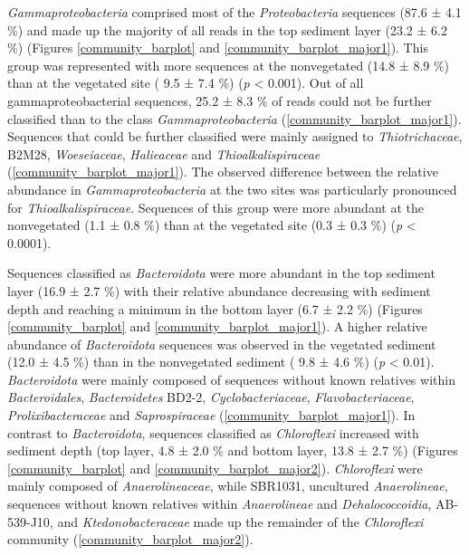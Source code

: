 \documentclass[12pt,]{article}
\begin{document}
\emph{Gammaproteobacteria} comprised most of the \emph{Proteobacteria}
sequences (87.6 ± 4.1 \si{\percent}) and made up the majority of all
reads in the top sediment layer (23.2 ± 6.2 \si{\percent}) (Figures
\ref{community_barplot} and \ref{community_barplot_major1}). This group
was represented with more sequences at the nonvegetated (14.8 ± 8.9
\si{\percent}) than at the vegetated site ( 9.5 ± 7.4 \si{\percent})
(\emph{p} \textless{} 0.001). Out of all gammaproteobacterial sequences,
25.2 ± 8.3 \si{\percent} of reads could not be further classified than
to the class \emph{Gammaproteobacteria}
(\autoref{community_barplot_major1}). Sequences that could be further
classified were mainly assigned to \emph{Thiotrichaceae}, B2M28,
\emph{Woeseiaceae}, \emph{Halieaceae} and \emph{Thioalkalispiraceae}
(\autoref{community_barplot_major1}). The observed difference between
the relative abundance in \emph{Gammaproteobacteria} at the two sites
was particularly pronounced for \emph{Thioalkalispiraceae}. Sequences of
this group were more abundant at the nonvegetated (1.1 ± 0.8
\si{\percent}) than at the vegetated site (0.3 ± 0.3 \si{\percent})
(\emph{p} \textless{} 0.0001).

Sequences classified as \emph{Bacteroidota} were more abundant in the
top sediment layer (16.9 ± 2.7 \si{\percent}) with their relative
abundance decreasing with sediment depth and reaching a minimum in the
bottom layer (6.7 ± 2.2 \si{\percent}) (Figures \ref{community_barplot}
and \ref{community_barplot_major1}). A higher relative abundance of
\emph{Bacteroidota} sequences was observed in the vegetated sediment
(12.0 ± 4.5 \si{\percent}) than in the nonvegetated sediment ( 9.8 ± 4.6
\si{\percent}) (\emph{p} \textless{} 0.01). \emph{Bacteroidota} were
mainly composed of sequences without known relatives within
\emph{Bacteroidales}, \emph{Bacteroidetes} BD2-2,
\emph{Cyclobacteriaceae}, \emph{Flavobacteriaceae},
\emph{Prolixibacteraceae} and \emph{Saprospiraceae}
(\autoref{community_barplot_major1}). In contrast to
\emph{Bacteroidota}, sequences classified as \emph{Chloroflexi}
increased with sediment depth (top layer, 4.8 ± 2.0 \si{\percent} and
bottom layer, 13.8 ± 2.7 \si{\percent}) (Figures \ref{community_barplot}
and \ref{community_barplot_major2}). \emph{Chloroflexi} were mainly
composed of \emph{Anaerolineaceae}, while SBR1031, uncultured
\emph{Anaerolineae}, sequences without known relatives within
\emph{Anaerolineae} and \emph{Dehalococcoidia}, AB-539-J10, and
\emph{Ktedonobacteraceae} made up the remainder of the
\emph{Chloroflexi} community (\autoref{community_barplot_major2}).
\end{document}
